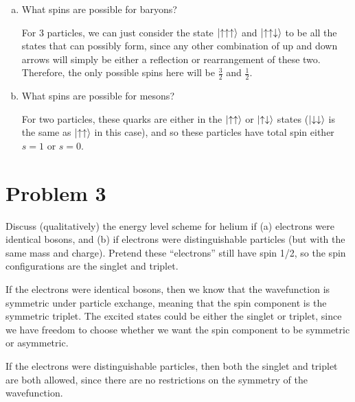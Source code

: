 \documentclass[10pt]{article}
\begin{document}
    \begin{enumerate}[(a)]
        \item What spins are possible for baryons? 
        
        \begin{solution}
            For 3 particles, we can just consider the state $\ket{\uparrow \uparrow \uparrow}$ and $\ket{\uparrow \uparrow \downarrow}$ to be all the states that can possibly form, since any other combination of up and down arrows will simply be either a reflection or rearrangement of these two. Therefore, the only possible spins here will be $\frac 32$ and $\frac 12$. 
        \end{solution}
        \item What spins are possible for mesons?
        
        \begin{solution}
            For two particles, these quarks are either in the $\ket{\uparrow \uparrow}$ or $\ket{\uparrow \downarrow}$ states ($\ket{\downarrow \downarrow}$ is the same as $\ket{\uparrow \uparrow}$ in this case), and so these particles have total spin either $s = 1$ or $s = 0$. 
        \end{solution}
    \end{enumerate}

    \pagebreak

    \section*{Problem 3} 
    
    Discuss (qualitatively) the energy level scheme for helium if (a) electrons were identical bosons, and (b) if electrons were distinguishable particles (but with the same mass and charge). Pretend these ``electrons'' still have spin 1/2, so the spin configurations are the singlet and triplet. 

    \begin{solution}
        If the electrons were identical bosons, then we know that the wavefunction is symmetric under particle exchange, meaning that the spin component is the symmetric triplet. The excited states could be either the singlet or triplet, since we have freedom to choose whether we want the spin component to be symmetric or asymmetric.

        If the electrons were distinguishable particles, then both the singlet and triplet are both allowed, since there are no restrictions on the symmetry of the wavefunction.
    \end{solution}
\end{document}

